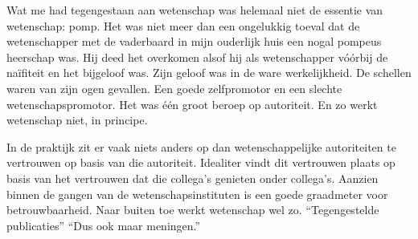 \documentclass[12pt,a4paper]{article}
\begin{document}
Wat me had tegengestaan aan wetenschap was helemaal niet de essentie van wetenschap: pomp. Het was niet meer dan een ongelukkig toeval dat de wetenschapper met de vaderbaard in mijn ouderlijk huis een nogal pompeus heerschap was. Hij deed het overkomen alsof hij als wetenschapper vóórbij de naïfiteit en het bijgeloof was. Zijn geloof was in de ware werkelijkheid. De schellen waren van zijn ogen gevallen. Een goede zelfpromotor en een slechte wetenschapspromotor. Het was één groot beroep op autoriteit. En zo werkt wetenschap niet, in principe.

In de praktijk zit er vaak niets anders op dan wetenschappelijke autoriteiten te vertrouwen op basis van die autoriteit. Idealiter vindt dit vertrouwen plaats op basis van het vertrouwen dat die collega's genieten onder collega's. Aanzien binnen de gangen van de wetenschapsinstituten is een goede graadmeter voor betrouwbaarheid. %
Naar buiten toe werkt wetenschap wel zo. “Tegengestelde publicaties” “Dus ook maar meningen.”


\end{document}
